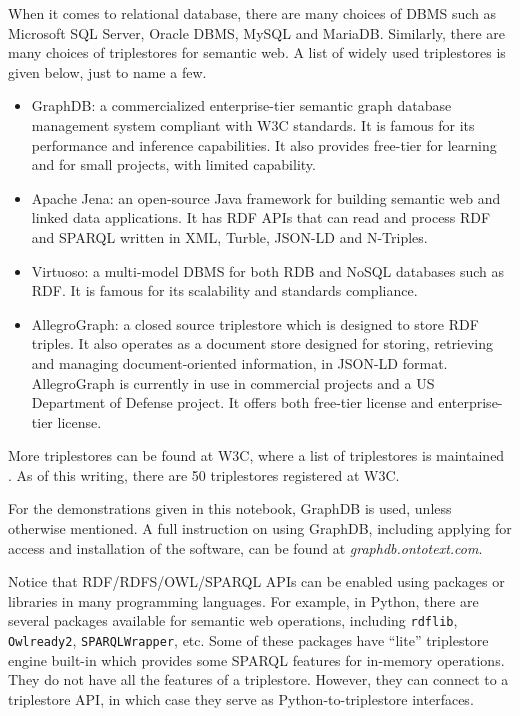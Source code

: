 When it comes to relational database, there are many choices of DBMS such as Microsoft SQL Server, Oracle DBMS, MySQL and MariaDB. Similarly, there are many choices of triplestores for semantic web. A list of widely used triplestores is given below, just to name a few.
\begin{itemize}
	\item GraphDB: a commercialized enterprise-tier semantic graph database management system compliant with W3C standards. It is famous for its performance and inference capabilities. It also provides free-tier for learning and for small projects, with limited capability.
	\item Apache Jena: an open-source Java framework for building semantic web and linked data applications. It has RDF APIs that can read and process RDF and SPARQL written in XML, Turble, JSON-LD and N-Triples.
	\item Virtuoso: a multi-model DBMS for both RDB and NoSQL databases such as RDF. It is famous for its scalability and standards compliance.
	\item AllegroGraph: a closed source triplestore which is designed to store RDF triples. It also operates as a document store designed for storing, retrieving and managing document-oriented information, in JSON-LD format. AllegroGraph is currently in use in commercial projects and a US Department of Defense project. It offers both free-tier license and enterprise-tier license.
\end{itemize}

More triplestores can be found at W3C, where a list of triplestores is maintained \cite{triplestore,largetriplestore}. As of this writing, there are 50 triplestores registered at W3C.

For the demonstrations given in this notebook, GraphDB is used, unless otherwise mentioned. A full instruction on using GraphDB, including applying for access and installation of the software, can be found at \textit{graphdb.ontotext.com}.

Notice that RDF/RDFS/OWL/SPARQL APIs can be enabled using packages or libraries in many programming languages. For example, in Python, there are several packages available for semantic web operations, including \verb|rdflib|, \verb|Owlready2|, \verb|SPARQLWrapper|, etc. Some of these packages have ``lite'' triplestore engine built-in which provides some SPARQL features for in-memory operations. They do not have all the features of a triplestore. However, they can connect to a triplestore API, in which case they serve as Python-to-triplestore interfaces.


